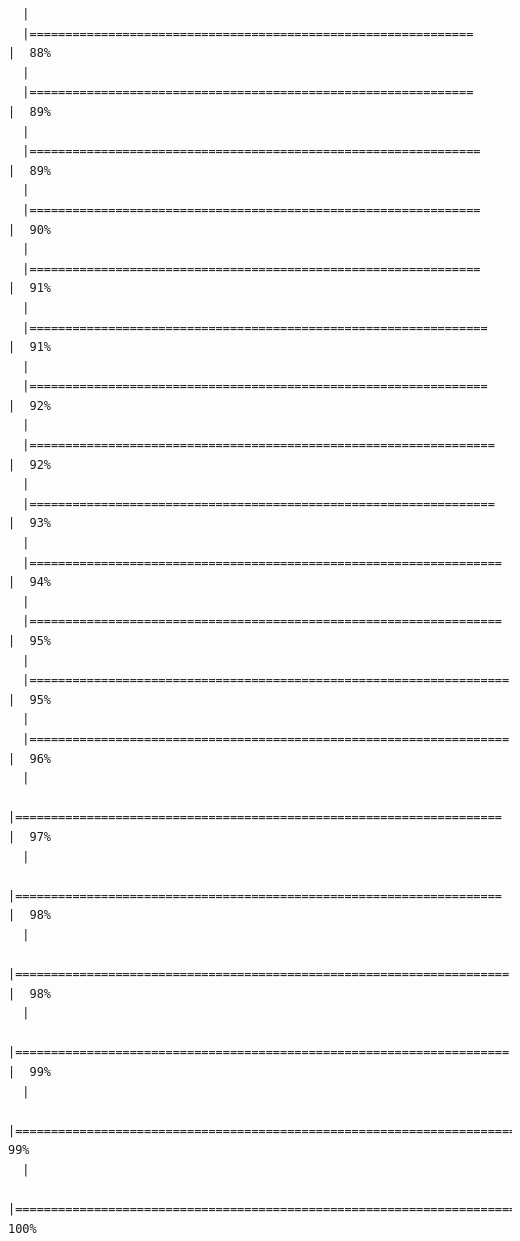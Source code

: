 \documentclass[
  letterpaper,
  DIV=11,
  numbers=noendperiod]{scrreprt}
\begin{document}
\begin{verbatim}
  |                                                                            
  |==============================================================        |  88%
  |                                                                            
  |==============================================================        |  89%
  |                                                                            
  |===============================================================       |  89%
  |                                                                            
  |===============================================================       |  90%
  |                                                                            
  |===============================================================       |  91%
  |                                                                            
  |================================================================      |  91%
  |                                                                            
  |================================================================      |  92%
  |                                                                            
  |=================================================================     |  92%
  |                                                                            
  |=================================================================     |  93%
  |                                                                            
  |==================================================================    |  94%
  |                                                                            
  |==================================================================    |  95%
  |                                                                            
  |===================================================================   |  95%
  |                                                                            
  |===================================================================   |  96%
  |                                                                            
  |====================================================================  |  97%
  |                                                                            
  |====================================================================  |  98%
  |                                                                            
  |===================================================================== |  98%
  |                                                                            
  |===================================================================== |  99%
  |                                                                            
  |======================================================================|  99%
  |                                                                            
  |======================================================================| 100%
\end{verbatim}
\end{document}
